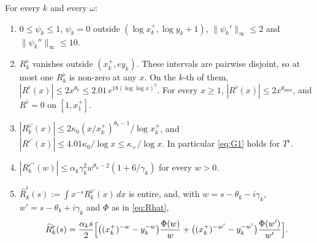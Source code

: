 \begin{lemma}\label{lem:onezero-osc}
For every $k$ and every $\omega$:
\begin{enumerate}[label=(\alph*)]
\item $0\le\psi_k\le1$, $\psi_k=0$ outside $(\log x_k^+,\log y_k+1)$, $\|\psi_k'\|_\infty\le2$ and $\|\psi_k''\|_\infty\le10$.
\item $R_k^\flat$ vanishes outside $(x_k^+,ey_k)$. These intervals are pairwise disjoint, so at most one $R_k^\flat$ is non-zero at
any $x$. On the $k$-th of them, $|R^\flat(x)|\le2x^{\theta_k}\le2.01\,e^{18(\log\log x)^2}$. For every $x\ge1$,
$|R^\flat(x)|\le2x^{\theta_{\max}}$, and $R^\flat=0$ on $[1,x_1^+]$.
\item $|R_k^{\flat\prime}(x)|\le2\kappa_0(x/x_k^+)^{\theta_k-1}/\log x_k^+$, and $|R^{\flat\prime}(x)|\le4.01\kappa_0/\log x\le\kappa_+/\log x$.
In particular \eqref{eq:G1} holds for $T^\flat$.
\item $|R_k^{\flat\prime\prime}(w)|\le\alpha_k\gamma_k^2w^{\theta_k-2}(1+6/\gamma_k)$ for every $w>0$.
\item $\widehat R_k^\flat(s):=\int x^{-s}R_k^{\flat\prime}(x)\,dx$ is entire, and, with $w=s-\theta_k-i\gamma_k$, $w'=s-\theta_k+i\gamma_k$
and $\Phi$ as in \eqref{eq:Rhat},
\begin{equation}\label{eq:Rhatflat}
  \widehat R_k^\flat(s)=\frac{\alpha_ks}2\Bigl[\bigl((x_k^+)^{-w}-y_k^{-w}\bigr)\frac{\Phi(w)}w
  +\bigl((x_k^+)^{-w'}-y_k^{-w'}\bigr)\frac{\Phi(w')}{w'}\Bigr].
\end{equation}
\end{enumerate}
\end{lemma}

